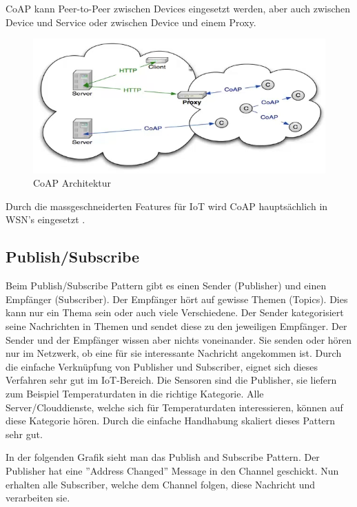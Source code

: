 CoAP kann Peer-to-Peer zwischen Devices eingesetzt werden, aber auch zwischen Device und Service oder zwischen Device und einem Proxy.
\begin{figure}[H]
\centering
\includegraphics[scale=0.8]{../02_Analyse/images/coap_architecture.png}
\caption{CoAP Architektur \cite{Shelby14}}
\end{figure}
  
Durch die massgeschneiderten Features für IoT wird CoAP hauptsächlich in WSN's eingesetzt \cite{Obermaier15}. 

\subsection{Publish/Subscribe}
Beim Publish/Subscribe Pattern gibt es einen Sender (Publisher) und einen Empfänger (Subscriber). Der Empfänger hört auf gewisse Themen (Topics). Dies kann nur ein Thema sein oder auch viele Verschiedene. Der Sender kategorisiert seine Nachrichten in Themen und sendet diese zu den jeweiligen Empfänger. Der Sender und der Empfänger wissen aber nichts voneinander. Sie senden oder hören nur im Netzwerk, ob eine für sie interessante Nachricht angekommen ist. Durch die einfache Verknüpfung von Publisher und Subscriber, eignet sich dieses Verfahren sehr gut im IoT-Bereich. Die Sensoren sind die Publisher, sie liefern zum Beispiel Temperaturdaten in die richtige Kategorie. Alle Server/Clouddienste, welche sich für Temperaturdaten interessieren, können auf diese Kategorie hören. Durch die einfache Handhabung skaliert dieses Pattern sehr gut.

In der folgenden Grafik sieht man das Publish and Subscribe Pattern. Der Publisher hat eine ''Address Changed'' Message in den Channel geschickt. Nun erhalten alle Subscriber, welche dem Channel folgen, diese Nachricht und verarbeiten sie.

